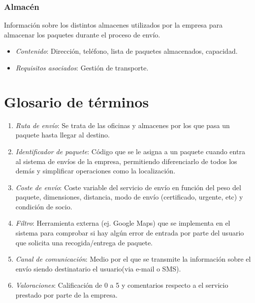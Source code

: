 \subsubsection{Almacén}
Información sobre los distintos almacenes utilizados por la empresa para almacenar los paquetes durante el proceso de envío.
\begin{itemize}
	\item \textit{Contenido}: Dirección, teléfono, lista de paquetes almacenados, capacidad.
	
	\item \textit{Requisitos asociados}: Gestión de transporte. \\
\end{itemize}

\newpage

\section{Glosario de términos}
	\begin{enumerate}
		\item \textit{Ruta de envío}: Se trata de las oficinas y almacenes por los que pasa un paquete hasta llegar al destino.
		\item \textit{Identificador de paquete}: Código que se le asigna a un paquete cuando entra al sistema de envíos de la empresa, permitiendo diferenciarlo de todos los demás y simplificar operaciones como la localización.
		\item \textit{Coste de envío}: Coste variable del servicio de envío en función del peso del paquete, dimensiones, distancia, modo de envío (certificado, urgente, etc) y condición de socio.
		\item \textit{Filtro}: Herramienta externa (ej. Google Maps) que se implementa  en el sistema para comprobar si hay algún error de entrada por parte del usuario que solicita una recogida/entrega de paquete.
		\item \textit{Canal de comunicación}: Medio por el que se transmite la información sobre el envío siendo destinatario el usuario(via e-mail o SMS).
		\item \textit{Valoraciones}: Calificación de 0 a 5 y comentarios respecto a el servicio prestado por parte de la empresa.
		
 	\end{enumerate}
\newpage


